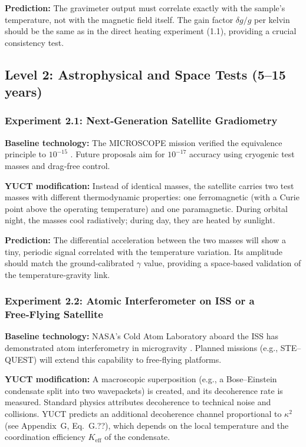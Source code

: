\documentclass[12pt]{article}
\theoremstyle{remark}
\newcommand{\Keff}{K_{\mathrm{eff}}}
\begin{document}
	\textbf{Prediction:} The gravimeter output must correlate exactly with the sample’s temperature, not with the
	magnetic field itself.  
	The gain factor \(\delta g/g\) per kelvin should be the same as in the direct heating experiment (1.1),
	providing a crucial consistency test.
	
	\subsection{Level 2: Astrophysical and Space Tests (5–15 years)}
	\label{subsec:space-tests}
	
	\subsubsection{Experiment 2.1: Next‑Generation Satellite Gradiometry}
	
	\textbf{Baseline technology:} The MICROSCOPE mission verified the equivalence principle to \(10^{-15}\)
	\cite{Touboul2022}.  
	Future proposals aim for \(10^{-17}\) accuracy using cryogenic test masses and drag‑free control.
	
	\textbf{YUCT modification:} Instead of identical masses, the satellite carries two test masses with different
	thermodynamic properties: one ferromagnetic (with a Curie point above the operating temperature) and one
	paramagnetic.  
	During orbital night, the masses cool radiatively; during day, they are heated by sunlight.
	
	\textbf{Prediction:} The differential acceleration between the two masses will show a tiny, periodic signal
	correlated with the temperature variation.  
	Its amplitude should match the ground‑calibrated \(\gamma\) value, providing a space‑based validation of the
	temperature‑gravity link.
	
	\subsubsection{Experiment 2.2: Atomic Interferometer on ISS or a Free‑Flying Satellite}
	
	\textbf{Baseline technology:} NASA’s Cold Atom Laboratory aboard the ISS has demonstrated atom interferometry in
	microgravity \cite{Aveline2020}.  
	Planned missions (e.g., STE–QUEST) will extend this capability to free‑flying platforms.
	
	\textbf{YUCT modification:} A macroscopic superposition (e.g., a Bose–Einstein condensate split into two
	wavepackets) is created, and its decoherence rate is measured.  
	Standard physics attributes decoherence to technical noise and collisions. YUCT predicts an additional
	decoherence channel proportional to \(\kappa^2\) (see Appendix~G, Eq.~G.??), which depends on the local
	temperature and the coordination efficiency \(\Keff\) of the condensate.
	
\end{document}
